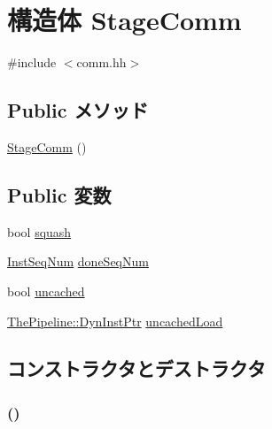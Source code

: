 \hypertarget{structTimeStruct_1_1StageComm}{
\section{構造体 StageComm}
\label{structTimeStruct_1_1StageComm}
}


{\ttfamily \#include $<$comm.hh$>$}\subsection*{Public メソッド}
\begin{DoxyCompactItemize}
\item 
\hyperlink{structTimeStruct_1_1StageComm_aaac6b5aef0cbbd316de559fd0cbbe362}{StageComm} ()
\end{DoxyCompactItemize}
\subsection*{Public 変数}
\begin{DoxyCompactItemize}
\item 
bool \hyperlink{structTimeStruct_1_1StageComm_a61b7f55a2e0399c2eee9f78204b37d8c}{squash}
\item 
\hyperlink{inst__seq_8hh_a258d93d98edaedee089435c19ea2ea2e}{InstSeqNum} \hyperlink{structTimeStruct_1_1StageComm_a45920c1d79a22b1320274c5f53504654}{doneSeqNum}
\item 
bool \hyperlink{structTimeStruct_1_1StageComm_aab896ca9f63476ee85c0cac2bbff0811}{uncached}
\item 
\hyperlink{classRefCountingPtr}{ThePipeline::DynInstPtr} \hyperlink{structTimeStruct_1_1StageComm_ae42796598d4714d10cdab6dda7cdf2c2}{uncachedLoad}
\end{DoxyCompactItemize}


\subsection{コンストラクタとデストラクタ}
\hypertarget{structTimeStruct_1_1StageComm_aaac6b5aef0cbbd316de559fd0cbbe362}{
\subsubsection[{StageComm}]{ ()}}
\label{structTimeStruct_1_1StageComm_aaac6b5aef0cbbd316de559fd0cbbe362}



